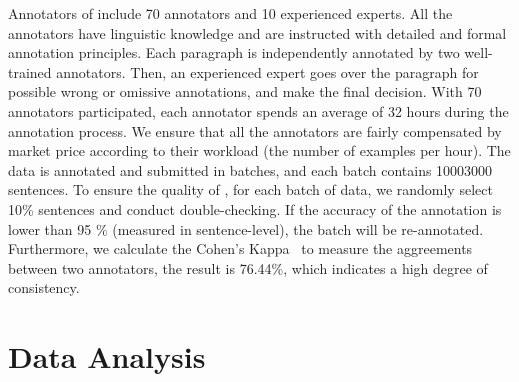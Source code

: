 \documentclass[11pt,a4paper, dvipsnames]{article}
\begin{document}
\begin{table}[]
    \centering
    \caption{An annotated case of }
    \label{tab:case}
    \vspace{-0.24cm}
\end{table}


Annotators of  include 70 annotators and 10 experienced experts. All the annotators have linguistic knowledge and are instructed with detailed and formal annotation principles. Each paragraph is independently annotated by two well-trained annotators. Then, an experienced expert goes over the paragraph for possible wrong or omissive annotations, and make the final decision. With 70 annotators participated, each annotator spends an average of 32 hours during the annotation process. We ensure that all the annotators are fairly compensated by market price according to their workload (the number of examples per hour).  
The data is annotated and submitted in batches, and each batch contains 10003000 sentences.
To ensure the quality of , for each batch of data, we randomly select 10\% sentences and conduct double-checking. If the accuracy of the annotation is lower than 95 \% (measured in sentence-level), the batch will be re-annotated. Furthermore, we calculate the Cohen's Kappa~\cite{cohen1960coefficient} to measure the aggreements between two annotators, the result is 76.44\%, which indicates a high degree of consistency.



\section{Data Analysis}
\end{document}
